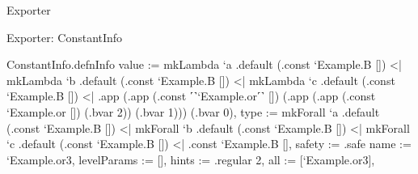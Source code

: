 \begin{frame}[fragile]{Exporter}
  \begin{overprint}

  \end{overprint}
\end{frame}

\begin{frame}[fragile]{Exporter: ConstantInfo} %
  \begin{LeanCode}[frame=none]
    ConstantInfo.defnInfo {
      value := mkLambda `a .default (.const `Example.B [])
            <| mkLambda `b .default (.const `Example.B [])
            <| mkLambda `c .default (.const `Example.B [])
            <| .app (.app (.const ˹˺`Example.or˹˺ [])
                (.app (.app (.const `Example.or [])
                  (.bvar 2)) (.bvar 1)))
                (.bvar 0),
      type := mkForall `a .default (.const `Example.B [])
           <| mkForall `b .default (.const `Example.B [])
           <| mkForall `c .default (.const `Example.B [])
           <| .const `Example.B [],
      safety := .safe
      name := `Example.or3,
      levelParams := [],
      hints := .regular 2,
      all := [`Example.or3],
    }
  \end{LeanCode}
\end{frame}

